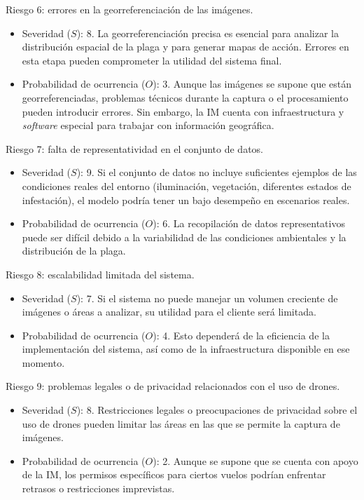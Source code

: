 \documentclass[
11pt, %
]{charter}
\begin{document}
Riesgo 6: errores en la georreferenciación de las imágenes.
\begin{itemize}
  \item Severidad ($S$): 8. La georreferenciación precisa es esencial para analizar la distribución espacial de la plaga y para generar mapas de acción. Errores en esta etapa pueden comprometer la utilidad del sistema final.
  \item Probabilidad de ocurrencia ($O$): 3. Aunque las imágenes se supone que están georreferenciadas, problemas técnicos durante la captura o el procesamiento pueden introducir errores. Sin embargo, la IM cuenta con infraestructura y \textit{software} especial para trabajar con información geográfica.
\end{itemize}

Riesgo 7: falta de representatividad en el conjunto de datos.
\begin{itemize}
  \item Severidad ($S$): 9. Si el conjunto de datos no incluye suficientes ejemplos de las condiciones reales del entorno (iluminación, vegetación, diferentes estados de infestación), el modelo podría tener un bajo desempeño en escenarios reales.
  \item Probabilidad de ocurrencia ($O$): 6. La recopilación de datos representativos puede ser difícil debido a la variabilidad de las condiciones ambientales y la distribución de la plaga.
\end{itemize}

Riesgo 8: escalabilidad limitada del sistema.
\begin{itemize}
  \item Severidad ($S$): 7. Si el sistema no puede manejar un volumen creciente de imágenes o áreas a analizar, su utilidad para el cliente será limitada.
  \item Probabilidad de ocurrencia ($O$): 4. Esto dependerá de la eficiencia de la implementación del sistema, así como de la infraestructura disponible en ese momento.
\end{itemize}

Riesgo 9: problemas legales o de privacidad relacionados con el uso de drones.
\begin{itemize}
  \item Severidad ($S$): 8. Restricciones legales o preocupaciones de privacidad sobre el uso de drones pueden limitar las áreas en las que se permite la captura de imágenes.
  \item Probabilidad de ocurrencia ($O$): 2. Aunque se supone que se cuenta con apoyo de la IM, los permisos específicos para ciertos vuelos podrían enfrentar retrasos o restricciones imprevistas.
\end{itemize}
\end{document}

